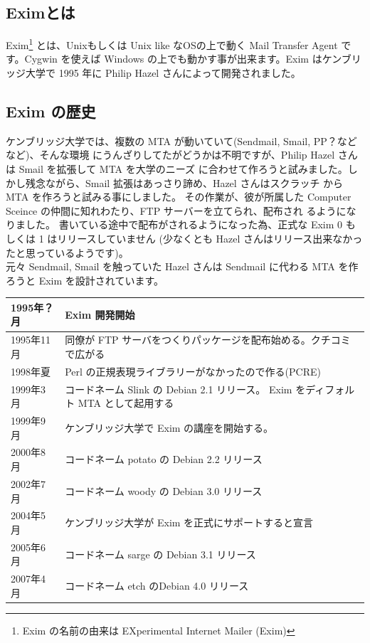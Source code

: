 \documentclass[mingoth,a4paper]{jsarticle}
\begin{document}
\subsection{Eximとは}
Exim\footnote{Exim の名前の由来は EXperimental Internet Mailer (Exim)}
 とは、Unixもしくは Unix like なOSの上で動く Mail Transfer Agent です。Cygwin 
を使えば Windows の上でも動かす事が出来ます。Exim はケンブリッジ大学で 1995 年に Philip Hazel 
さんによって開発されました。\\

\subsection{Exim の歴史}
ケンブリッジ大学では、複数の MTA が動いていて(Sendmail, Smail, PP？などなど)、そんな環境
にうんざりしてたがどうかは不明ですが、Philip Hazel さんは Smail を拡張して MTA を大学のニーズ
に合わせて作ろうと試みました。しかし残念ながら、Smail 拡張はあっさり諦め、Hazel さんはスクラッチ
から MTA を作ろうと試みる事にしました。
その作業が、彼が所属した Computer Sceince の仲間に知れわたり、FTP サーバーを立てられ、配布され
るようになりました。
書いている途中で配布がされるようになった為、正式な Exim 0 もしくは 1 はリリースしていません
(少なくとも Hazel さんはリリース出来なかったと思っているようです)。\\
元々 Sendmail, Smail を触っていた Hazel さんは Sendmail に代わる MTA を作ろうと Exim 
を設計されています。 \\
\begin{tabular}[htb]{|l|l|} \hline
1995年？月 & Exim 開発開始\\ \hline
1995年11月 & 同僚が FTP サーバをつくりパッケージを配布始める。クチコミで広がる\\ \hline
1998年夏 & Perl の正規表現ライブラリーがなかったので作る(PCRE)\\ \hline
1999年3月 & コードネーム Slink の Debian 2.1 リリース。 Exim をディフォルト MTA として起用する \\ \hline
1999年9月 & ケンブリッジ大学で Exim の講座を開始する。 \\ \hline
2000年8月 & コードネーム potato の Debian 2.2 リリース\\ \hline
2002年7月 & コードネーム woody の Debian 3.0 リリース\\ \hline
2004年5月 & ケンブリッジ大学が Exim を正式にサポートすると宣言\\ \hline
2005年6月 & コードネーム sarge の Debian 3.1 リリース\\ \hline
2007年4月 & コードネーム etch のDebian 4.0 リリース\\ \hline
\end{tabular}
\end{document}
